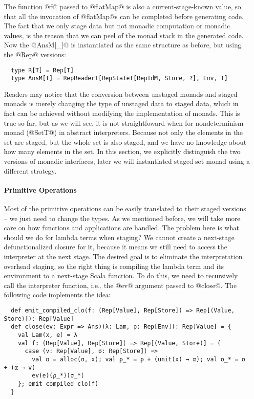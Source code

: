 The function @f@ passed to @flatMap@ is also a current-stage-known value, so
that all the invocation of @flatMap@s can be completed before generating code.
The fact that we only stage data but not monadic computation or monadic
values, is the reason that we can peel of the monad stack in the generated code.
Now the @AnsM[_]@ is instantiated as the same structure as before, but using the
@Rep@ versions:
\begin{lstlisting}
  type R[T] = Rep[T]
  type AnsM[T] = RepReaderT[RepStateT[RepIdM, Store, ?], Env, T]
\end{lstlisting}

Readers may notice that the conversion between unstaged monads and staged monads
is merely changing the type of unstaged data to staged data, which in fact can be
achieved without modifying the implementation of monads. This is true so far, but
as we will see, it is not straightfoward when for nondeterminism monad
(@SetT@) in abstract interpreters. Because not only the elements in the set are staged,
but the whole set is also staged, and we have no knowledge about how many elements
in the set. In this section, we explicitly distinguish the two versions of monadic interfaces,
later we will instantiated staged set monad using a different strategy.

\paragraph{Primitive Operations} Most of the primitive operations can be easily
translated to their staged versions -- we just need to change the types.
As we mentioned before, we will take more care on how functions and
applications are handled. The problem here is what should we do for
lambda terms when staging? We cannot create a next-stage
defunctionalized closure for it, because it means we still need to
access the interpreter at the next stage. The desired goal is to eliminate the
interpretation overhead staging, so the right thing is compiling the lambda term
and its environment to a next-stage Scala function. To do this, we need to
recursively call the interpreter function, i.e., the @ev@ argument passed to @close@.
The following code implements the idea:

\begin{lstlisting}
  def emit_compiled_clo(f: (Rep[Value], Rep[Store]) => Rep[(Value, Store)]): Rep[Value]
  def close(ev: Expr => Ans)(λ: Lam, ρ: Rep[Env]): Rep[Value] = {
    val Lam(x, e) = λ
    val f: (Rep[Value], Rep[Store]) => Rep[(Value, Store)] = {
      case (v: Rep[Value], σ: Rep[Store]) =>
        val α = alloc(σ, x); val ρ_* = ρ + (unit(x) → α); val σ_* = σ + (α → v)
        ev(e)(ρ_*)(σ_*)
    }; emit_compiled_clo(f)
  }
\end{lstlisting}

